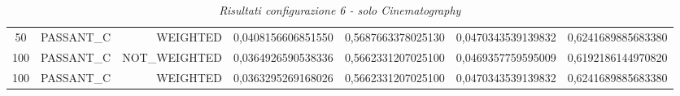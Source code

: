 \begin{table}[H]
{\begin{tabular}{ c l r c c c c }
				50 &  PASSANT\_C &   WEIGHTED & 0,0408156606851550 & 0,5687663378025130 & 0,0470343539139832 & 0,6241689885683380 \\
				
				100 &  PASSANT\_C & NOT\_WEIGHTED & 0,0364926590538336 & 0,5662331207025100 & 0,0469357759595009 & 0,6192186144970820 \\
				
				100 &  PASSANT\_C &   WEIGHTED & 0,0363295269168026 & 0,5662331207025100 & 0,0470343539139832 & 0,6241689885683380 \\
			\bottomrule
		\end{tabular}  
	}
	\caption{\emph{Risultati configurazione 6 - solo Cinematography}}
\end{table}

\setlength{\tabcolsep}{12pt}
